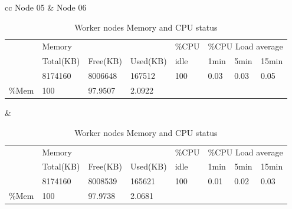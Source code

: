 \documentclass[12pt,a4paper]{report}
\begin{document}
\begin{table}[h!]
\hspace*{-0.9in}
\begin{tabular}{ cc }   %
Node 05 &  Node 06 \\  
\begin{adjustbox}{max width=0.6\textwidth}
\begin{tabular}{l|l|l|l|llll}
\cline{2-8}
\multirow{3}{*}{}           & \multicolumn{3}{l|}{Memory}     & \multicolumn{1}{l|}{\%CPU} & \multicolumn{3}{l|}{\%CPU Load average}                                            \\ \cline{2-8} 
                            & Total(KB) & Free(KB) & Used(KB) & \multicolumn{1}{l|}{idle}  & \multicolumn{1}{l|}{1min} & \multicolumn{1}{l|}{5min} & \multicolumn{1}{l|}{15min} \\ \cline{2-8} 
                            & 8174160   & 8006648  & 167512   & \multicolumn{1}{l|}{100}   & \multicolumn{1}{l|}{0.03} & \multicolumn{1}{l|}{0.03} & \multicolumn{1}{l|}{0.05}  \\ \hline
\multicolumn{1}{|l|}{\%Mem} & 100       & 97.9507  & 2.0922   &                            &                           &                           &                            \\ \cline{1-4}
\end{tabular}
\end{adjustbox} &  %
\begin{adjustbox}{max width=0.6\textwidth}
\begin{tabular}{l|l|l|l|llll}
\cline{2-8}
\multirow{3}{*}{}           & \multicolumn{3}{l|}{Memory}     & \multicolumn{1}{l|}{\%CPU} & \multicolumn{3}{l|}{\%CPU Load average}                                            \\ \cline{2-8} 
                            & Total(KB) & Free(KB) & Used(KB) & \multicolumn{1}{l|}{idle}  & \multicolumn{1}{l|}{1min} & \multicolumn{1}{l|}{5min} & \multicolumn{1}{l|}{15min} \\ \cline{2-8} 
                            & 8174160   & 8008539  & 165621   & \multicolumn{1}{l|}{100}   & \multicolumn{1}{l|}{0.01} & \multicolumn{1}{l|}{0.02} & \multicolumn{1}{l|}{0.03}  \\ \hline
\multicolumn{1}{|l|}{\%Mem} & 100       & 97.9738  & 2.0681   &                            &                           &                           &                            \\ \cline{1-4}
\end{tabular}
\end{adjustbox}\\
\end{tabular}
\caption{Worker nodes Memory and CPU status}%
\label{tab:worker-node}
\end{table}
\end{document}
